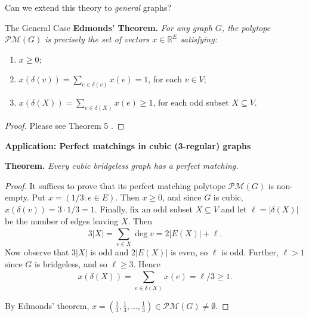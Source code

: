 
\begin{frame}
\begin{center}
\Large Can we extend this theory to \emph{general} graphs?
\end{center}
\end{frame}

\begin{frame}{The General Case}
	\textbf{Edmonds' Theorem.} \emph{For any graph \( G \), the polytope \( \mathcal{PM} (G) \) is precisely the set of vectors \( x \in \mathbb{R}^{E}  \) satisfying:} \pause
	\begin{enumerate}
		\item \( x \geq 0 \);\pause
		\item \( x (\delta (v)) = \sum_{e \in \delta (v)}^{} x(e) = 1  \), for each \( v \in V \); \pause
		\item \( x(\delta (X)) = \sum_{e \in \delta (X)}^{} x(e) \geq 1 \), for each odd subset \( X \subseteq V \). \pause
	\end{enumerate}
\begin{proof}
Please see Theorem 5 {}.
\end{proof}
\end{frame}

\begin{frame}
\begin{center}
	\Large \textbf{Application: Perfect matchings in cubic (3-regular) graphs}
\end{center}
\end{frame}

\begin{frame}
\vspace{0.3cm}
\textbf{Theorem.} \emph{Every cubic bridgeless graph has a perfect matching.} \pause
\begin{proof}
It suffices to prove that its perfect matching polytope \( \mathcal{PM}(G) \) is non-empty. \pause Put \( x = (1/3 : e \in E). \) \pause Then \( x \geq 0 \), and since \( G \) is cubic, \( x(\delta (v)) = 3 \cdot 1/3 = 1. \) \pause Finally, fix an odd subset \( X \subseteq V \) and let \( \ell = |\delta (X)| \) be the number of edges leaving \( X \). \pause Then \[3|X| = \sum_{v \in X}^{} \deg v = 2 |E(X)| + \ell. \] \pause Now observe that \( 3|X| \) is odd and \( 2|E(X)| \) is even, so \( \ell \) is odd. \pause Further, \( \ell > 1 \) since \( G \) is bridgeless, and so \( \ell \geq 3 \). \pause Hence \[ x(\delta (X)) = \sum_{e \in \delta (X)}^{} x(e) = \ell / 3 \geq 1.   \] \pause

By Edmonds' theorem, \(x = (\frac{1}{3} , \frac{1}{3} , \hdots ,\frac{1}{3} ) \in  \mathcal{PM} (G) \neq \emptyset  \).
\end{proof}
\end{frame}

